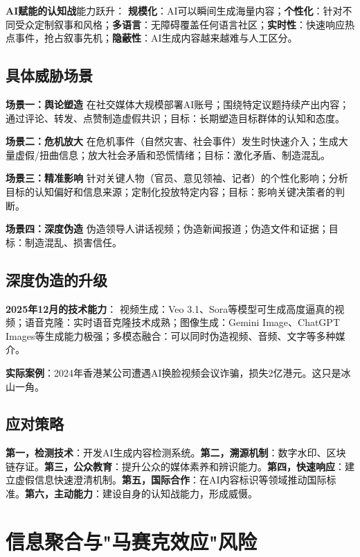 \textbf{AI赋能的认知战}能力跃升：
\textbf{规模化}：AI可以瞬间生成海量内容；\textbf{个性化}：针对不同受众定制叙事和风格；\textbf{多语言}：无障碍覆盖任何语言社区；\textbf{实时性}：快速响应热点事件，抢占叙事先机；\textbf{隐蔽性}：AI生成内容越来越难与人工区分。

\subsection{具体威胁场景}

\textbf{场景一：舆论塑造}
在社交媒体大规模部署AI账号；围绕特定议题持续产出内容；通过评论、转发、点赞制造虚假共识；目标：长期塑造目标群体的认知和态度。

\textbf{场景二：危机放大}
在危机事件（自然灾害、社会事件）发生时快速介入；生成大量虚假/扭曲信息；放大社会矛盾和恐慌情绪；目标：激化矛盾、制造混乱。

\textbf{场景三：精准影响}
针对关键人物（官员、意见领袖、记者）的个性化影响；分析目标的认知偏好和信息来源；定制化投放特定内容；目标：影响关键决策者的判断。

\textbf{场景四：深度伪造}
伪造领导人讲话视频；伪造新闻报道；伪造文件和证据；目标：制造混乱、损害信任。

\subsection{深度伪造的升级}

\textbf{2025年12月的技术能力}：
视频生成：Veo 3.1、Sora等模型可生成高度逼真的视频；语音克隆：实时语音克隆技术成熟；图像生成：Gemini Image、ChatGPT Images等生成能力极强；多模态融合：可以同时伪造视频、音频、文字等多种媒介。

\textbf{实际案例}：2024年香港某公司遭遇AI换脸视频会议诈骗，损失2亿港元。这只是冰山一角。

\subsection{应对策略}
\textbf{第一，检测技术}：开发AI生成内容检测系统。\textbf{第二，溯源机制}：数字水印、区块链存证。\textbf{第三，公众教育}：提升公众的媒体素养和辨识能力。\textbf{第四，快速响应}：建立虚假信息快速澄清机制。\textbf{第五，国际合作}：在AI内容标识等领域推动国际标准。\textbf{第六，主动能力}：建设自身的认知战能力，形成威慑。

\section{信息聚合与"马赛克效应"风险}

